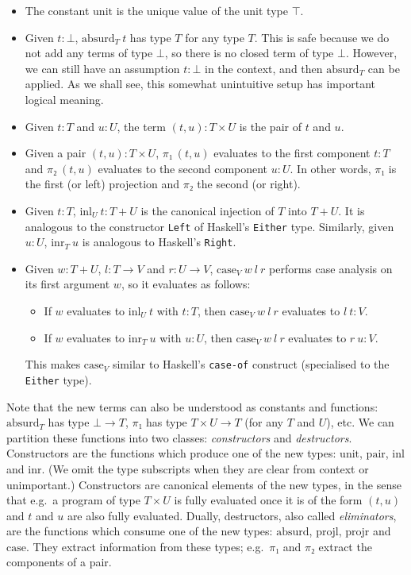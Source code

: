 \documentclass{scrartcl}
\theoremstyle{definition}
\newcommand{\unit}{\mathrm{unit}}
\newcommand{\absurd}{\mathrm{absurd}}
\newcommand{\pair}{\mathrm{pair}}
\newcommand{\projl}{\ensuremath{\mathrm{projl}}}
\newcommand{\projr}{\ensuremath{\mathrm{projr}}}
\newcommand{\inl}{\ensuremath{\mathrm{inl}}}
\newcommand{\inr}{\ensuremath{\mathrm{inr}}}
\newcommand{\case}{\mathrm{case}}
\begin{document}
\begin{itemize}
  \item The constant $\unit$ is the unique value of the unit type $⊤$.
  \item Given $t : ⊥$, $\absurd_{T}~t$ has type $T$ for any type $T$.
        This is safe because we do not add any terms of type $⊥$, so there is no closed term of type $⊥$.
        However, we can still have an assumption $t :  ⊥$ in the context, and then $\absurd_{T}$ can be applied.
        As we shall see, this somewhat unintuitive setup has important logical meaning.
  \item Given $t : T$ and $u : U$, the term $(t, u) : T × U$ is the pair of $t$ and $u$.
  \item Given a pair $(t, u) : T × U$, $π₁~(t, u)$ evaluates to the first component $t : T$ and $π₂~(t, u)$ evaluates to the second component $u : U$.
        In other words, $π₁$ is the first (or left) projection and $π₂$ the second (or right).
  \item Given $t : T$, $\inl_{U}~t : T + U$ is the canonical injection of $T$ into $T + U$.
        It is analogous to the constructor \texttt{Left} of Haskell's \texttt{Either} type.
        Similarly, given $u : U$, $\inr_{T}~u$ is analogous to Haskell's \texttt{Right}.
  \item Given $w : T + U$, $l : T → V$ and $r : U → V$, $\case_{V}~w~l~r$ performs case analysis on its first argument $w$, so it evaluates as follows:
        \begin{itemize}
          \item If $w$ evaluates to $\inl_{U}~t$ with $t : T$, then $\case_{V}~w~l~r$ evaluates to $l~t : V$.
          \item If $w$ evaluates to $\inr_{T}~u$ with $u : U$, then $\case_{V}~w~l~r$ evaluates to $r~u : V$.
        \end{itemize}
        This makes $\case_{V}$ similar to Haskell's \texttt{case-of} construct (specialised to the \texttt{Either} type).
\end{itemize}

Note that the new terms can also be understood as constants and functions: $\absurd_{T}$ has type $⊥ → T$, $π₁$ has type $T × U → T$ (for any $T$ and $U$), etc.
We can partition these functions into two classes: \emph{constructors} and \emph{destructors}.
Constructors are the functions which produce one of the new types: $\unit$, $\pair$, $\inl$ and $\inr$.
(We omit the type subscripts when they are clear from context or unimportant.)
Constructors are canonical elements of the new types, in the sense that e.g.\ a program of type $T × U$ is fully evaluated once it is of the form $(t,u)$ and $t$ and $u$ are also fully evaluated.
Dually, destructors, also called \emph{eliminators}, are the functions which consume one of the new types: $\absurd$, $\projl$, $\projr$ and $\case$.
They extract information from these types; e.g.\ $π₁$ and $π₂$ extract the components of a pair.
\end{document}
